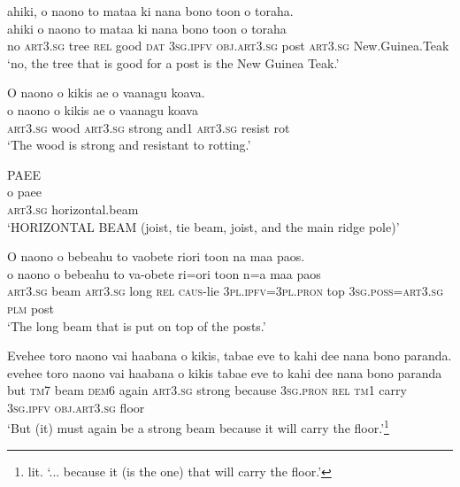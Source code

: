 \newpage
\ea\label{ex:text11-7}
ahiki, o naono to mataa ki nana bono toon o toraha.\\
\gll ahiki	o	naono	to	mataa	ki	nana	bono	toon	o	toraha\\
     no	\textsc{art}3.\textsc{sg}	tree	\textsc{rel}	good	\textsc{dat}	3\textsc{sg}.\textsc{ipfv}	\textsc{obj}.\textsc{art}3.\textsc{sg}	post	\textsc{art}3.\textsc{sg}	New.Guinea.Teak\\
\glt `no, the tree that is good for a post is the New Guinea Teak.'
\z

\ea\label{ex:text11-8}
O naono o kikis ae o vaanagu koava.\\
\gll o	naono	o	kikis	ae	o	vaanagu	koava\\
     \textsc{art}3.\textsc{sg}	wood	\textsc{art}3.\textsc{sg}	strong	and1	\textsc{art}3.\textsc{sg}	resist	rot\\
\glt `The wood is strong and resistant to rotting.'
\z

\ea\label{ex:text11-9}
PAEE\\
\gll o	paee\\
     \textsc{art}3.\textsc{sg}	horizontal.beam\\
\glt `HORIZONTAL BEAM (joist, tie beam, joist, and the main ridge pole)'
\z

\ea\label{ex:text11-10}
O naono o bebeahu to vaobete riori toon na maa paos.\\
\gll o	naono	o	bebeahu	to	va-obete	ri=ori	toon	n=a	maa	paos\\
     \textsc{art}3.\textsc{sg}	beam	\textsc{art}3.\textsc{sg}	long	\textsc{rel}	\textsc{caus}-lie	3\textsc{pl}.\textsc{ipfv}=3\textsc{pl}.\textsc{pron}	top	3\textsc{sg}.\textsc{poss}=\textsc{art}3.\textsc{sg}	\textsc{plm}	post\\
\glt `The long beam that is put on top of the posts.'
\z

\ea\label{ex:text11-11}
Evehee toro naono vai haabana o kikis, tabae eve to kahi dee nana bono paranda.\\
\gll evehee	toro	naono	vai	haabana	o	kikis	tabae	eve	to	kahi	dee	nana	bono	paranda\\
     but	\textsc{tm}7	beam	\textsc{dem}6	again	\textsc{art}3.\textsc{sg}	strong	because	3\textsc{sg}.\textsc{pron}	\textsc{rel}	\textsc{tm}1	carry	3\textsc{sg}.\textsc{ipfv}	\textsc{obj}.\textsc{art}3.\textsc{sg}	floor\\
\glt `But (it) must again be a strong beam because it will carry the floor.'\footnote{lit. `... because it (is the one) that will carry the floor.'}
\z

